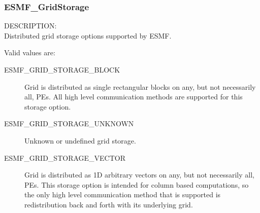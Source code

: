  \subsubsection{ESMF\_GridStorage}
 
 {\sf DESCRIPTION:\\}
 Distributed grid storage options supported by ESMF.
 
 Valid values are:
 \begin{description}
    \item [ESMF\_GRID\_STORAGE\_BLOCK]
          Grid is distributed as single rectangular blocks on any, but not
          necessarily all, PEs.  All high level communication methods are
          supported for this storage option.

    \item [ESMF\_GRID\_STORAGE\_UNKNOWN]
          Unknown or undefined grid storage.

    \item [ESMF\_GRID\_STORAGE\_VECTOR]
          Grid is distributed as 1D arbitrary vectors on any, but not
          necessarily all, PEs.  This storage option is intended for
          column based computations, so the only high level communication
          method that is supported is redistribution back and forth with
          its underlying grid.
 
 \end{description}


% 
% 
% 
% 


